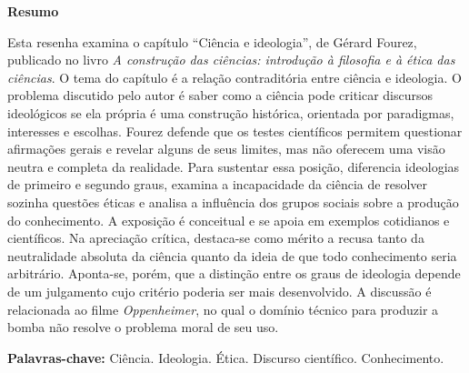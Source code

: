 \documentclass[12pt,a4paper]{article}
\begin{document}
\noindent\textbf{Resumo}\par
\noindent\setlength{\parindent}{0pt}%
Esta resenha examina o capítulo ``Ciência e ideologia'', de Gérard Fourez, publicado no livro \textit{A construção das ciências: introdução à filosofia e à ética das ciências}. O tema do capítulo é a relação contraditória entre ciência e ideologia. O problema discutido pelo autor é saber como a ciência pode criticar discursos ideológicos se ela própria é uma construção histórica, orientada por paradigmas, interesses e escolhas. Fourez defende que os testes científicos permitem questionar afirmações gerais e revelar alguns de seus limites, mas não oferecem uma visão neutra e completa da realidade. Para sustentar essa posição, diferencia ideologias de primeiro e segundo graus, examina a incapacidade da ciência de resolver sozinha questões éticas e analisa a influência dos grupos sociais sobre a produção do conhecimento. A exposição é conceitual e se apoia em exemplos cotidianos e científicos. Na apreciação crítica, destaca-se como mérito a recusa tanto da neutralidade absoluta da ciência quanto da ideia de que todo conhecimento seria arbitrário. Aponta-se, porém, que a distinção entre os graus de ideologia depende de um julgamento cujo critério poderia ser mais desenvolvido. A discussão é relacionada ao filme \textit{Oppenheimer}, no qual o domínio técnico para produzir a bomba não resolve o problema moral de seu uso.

\vspace{6pt}
\noindent\textbf{Palavras-chave:} Ciência. Ideologia. Ética. Discurso científico. Conhecimento.
\setlength{\parindent}{1.25cm}

\vspace{12pt}
\end{document}
